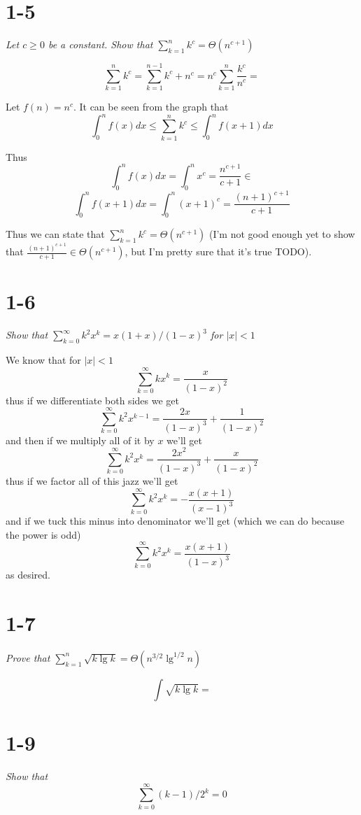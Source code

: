 \documentclass[11pt,oneside,titlepage]{book}
\begin{document}
\section*{1-5}
\textit{Let $c \geq 0$ be a constant. Show that
  $\sum_{k = 1}^{n}{k^c} = \Theta(n^{c + 1})$}

$$
\sum_{k = 1}^{n}{k^c} = \sum_{k = 1}^{n - 1}{k^c} + n^c =
n^c\sum_{k = 1}^{n}{\frac{k^c}{n^c}} =
$$

Let $f(n) = n^c$.
It can be seen from the graph that
$$\int_{0}^{n}{f(x)dx} \leq \sum_{k = 1}^{n}{k^c} \leq
\int_{0}^{n}{f(x + 1)dx}$$

Thus 
$$\int_0^n{f(x)dx} = \int_0^n{x^c} = \frac{n^{c + 1}}{c + 1} \in$$
$$\int_0^n{f(x + 1)dx} = \int_0^n{(x + 1)^c} = \frac{(n + 1)^{c + 1}}{c + 1}$$

Thus we can state that $\sum_{k = 1}^{n}{k^c} = \Theta(n^{c + 1})$
(I'm not good enough yet to show that $\frac{(n + 1)^{c + 1}}{c + 1} \in
\Theta(n^{c + 1})$, but I'm pretty sure that it's true TODO).



\section*{1-6}
\textit{Show that $\sum_{k=0}^{\infty}{k^2 x^k} = x(1 + x)/(1 - x)^3$ for
  $|x| < 1$}

We know that for $|x| < 1$
$$\sum_{k = 0}^{\infty}{kx^k} = \frac{x}{(1 - x)^2}$$
thus if we differentiate both sides we get
$$\sum_{k = 0}^{\infty}{k^2x^{k - 1}} = \frac{2x}{(1 - x)^3}
+ \frac{1}{(1 - x)^2} $$
and then if we multiply all of it by $x$ we'll get
$$\sum_{k = 0}^{\infty}{k^2x^k} = \frac{2x^2}{(1 - x)^3}
+ \frac{x}{(1 - x)^2} $$
thus if we factor all of this jazz we'll get
$$\sum_{k = 0}^{\infty}{k^2x^k} = - \frac{x(x + 1)}{(x - 1)^3}$$
and if we tuck this minus into denominator we'll get (which we can do because
the power is odd)
$$\sum_{k = 0}^{\infty}{k^2x^k} = \frac{x(x + 1)}{(1 - x)^3}$$
as desired.

\section*{1-7}
\textit{Prove that $\sum_{k = 1}^n{\sqrt{k \lg k}} = \Theta(n^{3/2}\lg^{1/2}n)$}

$$\int \sqrt{k \lg k} = $$

\section*{1-9}
\textit{Show that}
$$\sum_{k = 0}^{\infty}{(k - 1)/2^k} = 0$$
\end{document}
